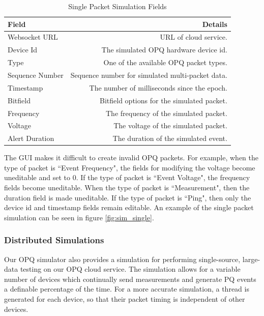 \documentclass[11pt]{article}
\begin{document}
\begin{table}[htbp]
	\caption{Single Packet Simulation Fields}
	\label{tab:single_packet_sim}
	\begin{center}
		\begin{tabular}{|l|r|}
			\hline
			\textbf{Field} & \textbf{Details}\\
			\hline
			Websocket URL & URL of cloud service.\\
			\hline
			Device Id & The simulated OPQ hardware device id.\\
			\hline
			Type & One of the available OPQ packet types.\\
			\hline
			Sequence Number & Sequence number for simulated multi-packet data.\\
			\hline
			Timestamp & The number of milliseconds since the epoch.\\
			\hline
			Bitfield & Bitfield options for the simulated packet.\\
			\hline
			Frequency & The frequency of the simulated packet.\\
			\hline
			Voltage & The voltage of the simulated packet.\\
			\hline
			Alert Duration & The duration of the simulated event.\\
			\hline
		\end{tabular}
	\end{center}
\end{table} 

The GUI makes it difficult to create invalid OPQ packets. For example, when the type of packet is ``Event Frequency", the fields for modifying the voltage become uneditable and set to 0. If the type of packet is ``Event Voltage", the frequency fields become uneditable. When the type of packet is ``Measurement", then the duration field is made uneditable. If the type of packet is ``Ping", then only the device id and timestamp fields remain editable. An example of the single packet simulation can be seen in figure \ref{fig:sim_single}.

\subsubsection{Distributed Simulations}
Our OPQ simulator also provides a simulation for performing single-source, large-data testing on our OPQ cloud service. The simulation allows for a variable number of devices which continually send measurements and generate PQ events a definable percentage of the time. For a more accurate simulation, a thread is generated for each device, so that their packet timing is independent of other devices.
\end{document}
